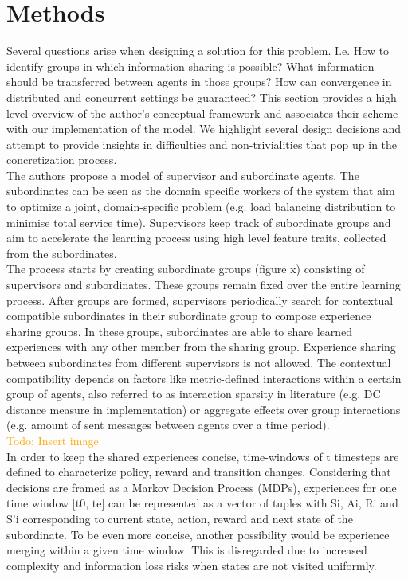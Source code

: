 \documentclass[letterpaper]{article}
\newcommand\todo[1]{\textcolor{orange}{Todo: #1}}
\begin{document}
\section{Methods} \label{sec:methods}
Several questions arise when designing a solution for this problem. I.e. How to identify groups in which information sharing is possible? What information should be transferred between agents in those groups? How can convergence in distributed and concurrent settings be guaranteed? This section provides a high level overview of the author’s conceptual framework and associates their scheme with our implementation of the model.  We highlight several design decisions and attempt to provide insights in difficulties and non-trivialities that pop up in the concretization process.\\
The authors propose a model of supervisor and subordinate agents. The subordinates can be seen as the domain specific workers of the system that aim to optimize a joint, domain-specific problem (e.g. load balancing distribution to minimise total service time). Supervisors keep track of subordinate groups and aim to accelerate the learning process using high level feature traits, collected from the subordinates.\\
The process starts by creating subordinate groups (figure x) consisting of supervisors and subordinates. These groups remain fixed over the entire learning process. After groups are formed, supervisors periodically search for contextual compatible subordinates in their subordinate group to compose experience sharing groups. In these groups, subordinates are able to share learned experiences with any other member from the sharing group. Experience sharing between subordinates from different supervisors is not allowed. The contextual compatibility depends on factors like metric-defined interactions within a certain group of agents, also referred to as interaction sparsity in literature (e.g. DC distance measure in implementation) or aggregate effects over group interactions (e.g. amount of sent messages between agents over a time period).\\
\todo{Insert image}\\
In order to keep the shared experiences concise, time-windows of t timesteps are defined to characterize policy, reward and transition changes. Considering that decisions are framed as a Markov Decision Process (MDPs), experiences for one time window [t0, te] can be represented as a vector of tuples with Si, Ai, Ri and S’i corresponding to current state, action, reward and next state of the subordinate. To be even more concise, another possibility would be experience merging within a given time window. This is disregarded due to increased complexity and information loss risks when states are not visited uniformly.\\
\end{document}
